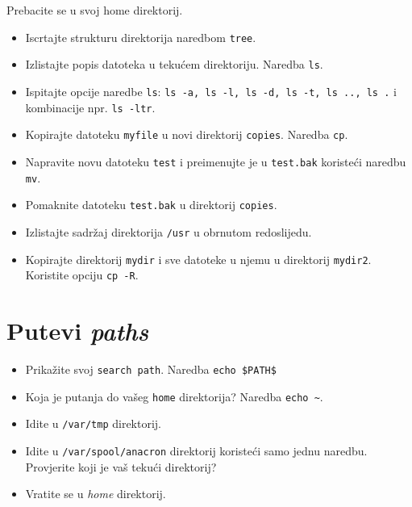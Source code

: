 \begin{zadatak}
Prebacite se u svoj home direktorij.
\begin{itemize}
\item Iscrtajte strukturu direktorija naredbom \texttt{tree}.
\item Izlistajte popis datoteka u tekućem direktoriju. Naredba \texttt{ls}.
\item Ispitajte opcije naredbe \texttt{ls}: \texttt{ls -a, ls -l, ls -d, ls -t, ls .., ls .} i kombinacije npr. \texttt{ls -ltr}.
\item Kopirajte datoteku \texttt{myfile} u novi direktorij \texttt{copies}. Naredba \texttt{cp}. 
\item Napravite novu datoteku \texttt{test} i preimenujte je u \texttt{test.bak} koristeći naredbu \texttt{mv}. 
\item Pomaknite datoteku \texttt{test.bak} u direktorij \texttt{copies}.
\item Izlistajte sadržaj direktorija \texttt{/usr} u obrnutom redoslijedu.
\item Kopirajte direktorij \texttt{mydir} i sve datoteke u njemu u direktorij \texttt{mydir2}. Koristite opciju \texttt{cp -R}.
\end{itemize}
\end{zadatak}

\section{Putevi \textit{paths}}
\begin{itemize}
 \item Prikažite svoj \texttt{search path}. Naredba \texttt{echo \$PATH\$} 
 
 
\item Koja je putanja do vašeg \texttt{home} direktorija? Naredba \texttt{echo \~}. 
\item Idite u \texttt{/var/tmp} direktorij.
\item Idite u \texttt{/var/spool/anacron} direktorij koristeći samo jednu naredbu. Provjerite koji je vaš tekući direktorij?
\item Vratite se u \textit{home} direktorij.
\end{itemize}


